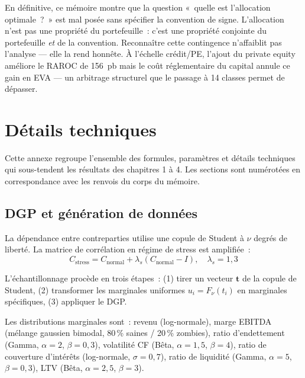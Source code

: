 \documentclass[10pt, a4paper, oneside]{report}
\theoremstyle{definition}
\begin{document}
\vspace{1cm}

En définitive, ce mémoire montre que la question «~quelle est l'allocation optimale~?~» est mal posée sans spécifier la convention de signe. L'allocation n'est pas une propriété du portefeuille~: c'est une propriété conjointe du portefeuille \emph{et} de la convention. Reconnaître cette contingence n'affaiblit pas l'analyse --- elle la rend honnête. À l'échelle crédit/PE, l'ajout du private equity améliore le RAROC de 156~pb mais le coût réglementaire du capital annule ce gain en EVA --- un arbitrage structurel que le passage à 14 classes permet de dépasser.


\appendix
\chapter{Détails techniques}
\label{chap:annexe}

Cette annexe regroupe l'ensemble des formules, paramètres et détails techniques qui sous-tendent les résultats des chapitres 1 à 4. Les sections sont numérotées en correspondance avec les renvois du corps du mémoire.


\section{DGP et génération de données}
\label{sec:annexe:dgp}

La dépendance entre contreparties utilise une copule de Student à $\nu$ degrés de liberté. La matrice de corrélation en régime de stress est amplifiée~:
\begin{equation}
C_{\text{stress}} = C_{\text{normal}} + \lambda_s (C_{\text{normal}} - I), \quad \lambda_s = 1{,}3
\label{eq:copula_corr}
\end{equation}

L'échantillonnage procède en trois étapes~: (1) tirer un vecteur $\mathbf{t}$ de la copule de Student, (2) transformer les marginales uniformes $u_i = F_\nu(t_i)$ en marginales spécifiques, (3) appliquer le DGP.

Les distributions marginales sont~: revenu (log-normale), marge EBITDA (mélange gaussien bimodal, 80\,\% saines / 20\,\% zombies), ratio d'endettement (Gamma, $\alpha = 2$, $\beta = 0{,}3$), volatilité CF (Bêta, $\alpha = 1{,}5$, $\beta = 4$), ratio de couverture d'intérêts (log-normale, $\sigma = 0{,}7$), ratio de liquidité (Gamma, $\alpha = 5$, $\beta = 0{,}3$), LTV (Bêta, $\alpha = 2{,}5$, $\beta = 3$).
\end{document}
